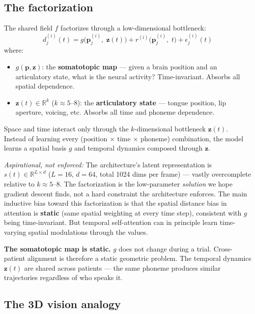 \documentclass[11pt,letterpaper]{article}
\newcommand{\bfp}{\mathbf{p}}
\newcommand{\bfz}{\mathbf{z}}
\newcommand{\R}{\mathbb{R}}
\begin{document}
\subsection{The factorization}\label{sec:factorization}

The shared field $f$ factorizes through a low-dimensional bottleneck:
\begin{equation}\label{eq:obs-function}
d_j^{(i)}(t) = g\bigl(\bfp_j^{(i)},\; \bfz(t)\bigr) + r^{(i)}\bigl(\bfp_j^{(i)},\; t\bigr) + \epsilon_j^{(i)}(t)
\end{equation}
where:
\begin{itemize}[leftmargin=2em]
\item $g(\bfp, \bfz)$: the \textbf{somatotopic map} --- given a brain position and an articulatory state, what is the neural activity? Time-invariant. Absorbs all spatial dependence.
\item $\bfz(t) \in \R^k$ ($k {\approx} 5$--$8$): the \textbf{articulatory state} --- tongue position, lip aperture, voicing, etc. Absorbs all time and phoneme dependence.
\end{itemize}

Space and time interact only through the $k$-dimensional bottleneck $\bfz(t)$. Instead of learning every (position $\times$ time $\times$ phoneme) combination, the model learns a spatial basis $g$ and temporal dynamics composed through $\bfz$.

\textcolor{BrickRed}{\textit{Aspirational, not enforced:}} The architecture's latent representation is $s(t) \in \R^{L \times d}$ ($L{=}16$, $d{=}64$, total 1024 dims per frame) --- vastly overcomplete relative to $k {\approx} 5$--$8$. The factorization is the low-parameter \textit{solution} we hope gradient descent finds, not a hard constraint the architecture enforces. The main inductive bias toward this factorization is that the spatial distance bias in attention is \textbf{static} (same spatial weighting at every time step), consistent with $g$ being time-invariant. But temporal self-attention can in principle learn time-varying spatial modulations through the values.

\textbf{The somatotopic map is static.} $g$ does not change during a trial. Cross-patient alignment is therefore a static geometric problem. The temporal dynamics $\bfz(t)$ are shared across patients --- the same phoneme produces similar trajectories regardless of who speaks it.


\subsection{The 3D vision analogy}\label{sec:analogy}
\end{document}
